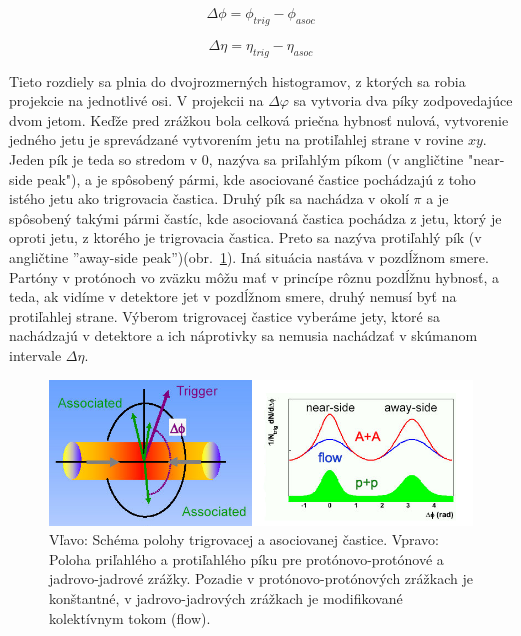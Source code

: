 \documentclass[thesismargins, thesislinespacing]{rnthesis}
\begin{document}
\begin{equation}
\Delta \phi = \phi_{trig} - \phi_{asoc}
\end{equation}

\begin{equation}
\Delta \eta = \eta_{trig} - \eta_{asoc}
\end{equation}

Tieto rozdiely sa plnia do dvojrozmerných histogramov, z ktorých sa robia projekcie na jednotlivé osi. V projekcii na $\Delta \varphi$ sa vytvoria dva píky zodpovedajúce dvom jetom. Keďže pred zrážkou bola celková priečna hybnosť nulová, vytvorenie jedného jetu je sprevádzané vytvorením jetu na protiľahlej strane v rovine $xy$. Jeden pík je teda so stredom v 0, nazýva sa priľahlým píkom (v angličtine "near-side peak"), a je spôsobený pármi, kde asociované častice pochádzajú z toho istého jetu ako trigrovacia častica. Druhý pík sa nachádza v okolí $\pi$ a je spôsobený takými pármi častíc, kde asociovaná častica pochádza z jetu, ktorý je oproti jetu, z ktorého je trigrovacia častica. Preto sa nazýva protiľahlý pík (v angličtine ''away-side peak'')(obr.~\ref{kor}). Iná situácia nastáva v pozdĺžnom smere. Partóny v protónoch vo zväzku môžu mať v princípe rôznu pozdĺžnu hybnosť, a teda, ak vidíme v detektore jet v pozdĺžnom smere, druhý nemusí byť na protiľahlej strane. Výberom trigrovacej častice vyberáme jety, ktoré sa nachádzajú v detektore a ich náprotivky sa nemusia nachádzať v skúmanom intervale $\Delta \eta$.

\begin{figure}[hbtp!]
	\begin{center}
		\includegraphics[width=\textwidth]{./Obrazky_praca/dijetcorrelations.png}
		\caption{Vľavo: Schéma polohy trigrovacej a asociovanej častice. Vpravo: Poloha priľahlého a protiľahlého píku pre protónovo-protónové a jadrovo-jadrové zrážky. Pozadie v protónovo-protónových zrážkach je konštantné, v jadrovo-jadrových zrážkach je \-mo\-di\-fi\-ko\-va\-né kolektívnym tokom (flow).}
		\label{kor}
	\end{center}
\end{figure}
\end{document}
